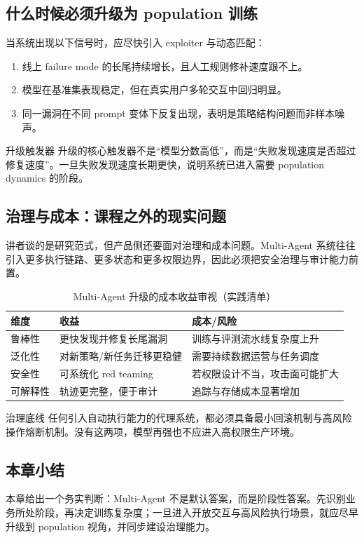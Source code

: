 \subsection{什么时候必须升级为 population 训练}
当系统出现以下信号时，应尽快引入 exploiter 与动态匹配：
\begin{enumerate}
    \item 线上 failure mode 的长尾持续增长，且人工规则修补速度跟不上。
    \item 模型在基准集表现稳定，但在真实用户多轮交互中回归明显。
    \item 同一漏洞在不同 prompt 变体下反复出现，表明是策略结构问题而非样本噪声。
\end{enumerate}

\begin{importantbox}{升级触发器}
升级的核心触发器不是``模型分数高低''，而是``失败发现速度是否超过修复速度''。一旦失败发现速度长期更快，说明系统已进入需要 population dynamics 的阶段。
\end{importantbox}

\subsection{治理与成本：课程之外的现实问题}
讲者谈的是研究范式，但产品侧还要面对治理和成本问题。Multi-Agent 系统往往引入更多执行链路、更多状态和更多权限边界，因此必须把安全治理与审计能力前置。

\begin{table}[H]
\centering
\caption{Multi-Agent 升级的成本收益审视（实践清单）}
\begin{tabular}{p{2.7cm}p{4.4cm}p{5.5cm}}
\toprule
维度 & 收益 & 成本/风险 \\
\midrule
鲁棒性 & 更快发现并修复长尾漏洞 & 训练与评测流水线复杂度上升 \\
泛化性 & 对新策略/新任务迁移更稳健 & 需要持续数据运营与任务调度 \\
安全性 & 可系统化 red teaming & 若权限设计不当，攻击面可能扩大 \\
可解释性 & 轨迹更完整，便于审计 & 追踪与存储成本显著增加 \\
\bottomrule
\end{tabular}
\end{table}

\begin{warningbox}{治理底线}
任何引入自动执行能力的代理系统，都必须具备最小回滚机制与高风险操作熔断机制。没有这两项，模型再强也不应进入高权限生产环境。
\end{warningbox}

\subsection{本章小结}
本章给出一个务实判断：Multi-Agent 不是默认答案，而是阶段性答案。先识别业务所处阶段，再决定训练复杂度；一旦进入开放交互与高风险执行场景，就应尽早升级到 population 视角，并同步建设治理能力。


